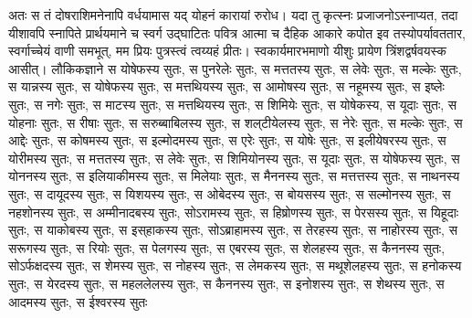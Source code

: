 \vakya अतः स तं दोषराशिमनेनापि वर्धयामास यद् योहनं कारायां रुरोध।
\vakya यदा तु कृत्स्नः प्रजाजनोऽस्नाप्यत, तदा यीशावपि स्नापिते प्रार्थयमाने च स्वर्ग उद्घाटितः
\vakya पवित्र आत्मा च दैहिक आकारे कपोत इव तस्योपर्यावततार, स्वर्गाच्चेयं वाणी समभूत्, मम प्रियः पुत्रस्त्वं त्वय्यहं प्रीतः।
\vakya स्वकार्यमारभमाणो यीशुः प्रायेण त्रिंशद्वर्षवयस्क आसीत्।
\vakya लौकिकज्ञाने स योषेफस्य सुतः, स पुनरेलेः सुतः, स मत्ततस्य सुतः, स लेवेः सुतः, स मल्केः सुतः, स यान्नस्य सुतः, स योषेफस्य सुतः,
\vakya स मत्तथियस्य सुतः, स आमोषस्य सुतः, स नहूमस्य सुतः, स इष्लेः सुतः, स नगेः सुतः,
\vakya स माटस्य सुतः, स मत्तथियस्य सुतः, स शिमियेः सुतः, स योषेकस्य, स यूदाः सुतः,
\vakya स योहनाः सुतः, स रीषाः सुतः, स सरुब्बाबिलस्य सुतः, स शल्‌टीयेलस्य सुतः, स नेरेः सुतः,
\vakya स मल्केः सुतः, स आद्देः सुतः, स कोषमस्य सुतः, स इल्मोदमस्य सुतः, स एरेः सुतः,
\vakya स योषेः सुतः, स इलीयेषरस्य सुतः, स योरीमस्य सुतः, स मत्ततस्य सुतः, स लेवेः सुतः,
\vakya स शिमियोनस्य सुतः, स यूदाः सुतः, स योषेफस्य सुतः, स योननस्य सुतः, स इलियाकीमस्य सुतः,
\vakya स मिलेयाः सुतः, स मैननस्य सुतः, स मत्तत्तस्य सुतः, स नाथनस्य सुतः, स दायूदस्य सुतः,
\vakya स यिशयस्य सुतः, स ओबेदस्य सुतः, स बोयसस्य सुतः, स सल्मोनस्य सुतः, स नहशोनस्य सुतः,
\vakya स अम्मीनादबस्य सुतः, सोऽरामस्य सुतः, स हिष्रोणस्य सुतः, स पेरसस्य सुतः, स यिहूदाः सुतः,
\vakya स याकोबस्य सुतः, स इस्‌हाकस्य सुतः, सोऽब्राहामस्य सुतः, स तेरहस्य सुतः,
\vakya स नाहोरस्य सुतः, स सरूगस्य सुतः, स रियोः सुतः, स पेलगस्य सुतः, स एबरस्य सुतः, स शेलहस्य सुतः,
\vakya स कैननस्य सुतः, सोऽर्फक्षदस्य सुतः, स शेमस्य सुतः, स नोहस्य सुतः, स लेमकस्य सुतः,
\vakya स मथूशेलहस्य सुतः, स हनोकस्य सुतः, स येरदस्य सुतः, स महललेलस्य सुतः, स कैननस्य सुतः,
\vakya स इनोशस्य सुतः, स शेथस्य सुतः, स आदमस्य सुतः, स ईश्वरस्य सुतः\eoc